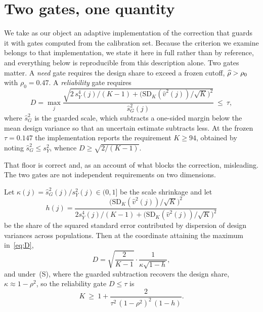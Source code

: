 \section{Two gates, one quantity}\label{sec:coupling}

We take as our object an adaptive implementation of the correction that guards
it with gates computed from the calibration set. Because the criterion we
examine belongs to that implementation, we state it here in full rather than by
reference, and everything below is reproducible from this description alone.
Two gates matter. A \emph{need}
gate requires the design share to exceed a frozen cutoff, $\widehat{\rho}>\rho_0$ with
$\rho_0=0.47$. A \emph{reliability} gate requires
\begin{equation}\label{eq:D}
D=\max_j\frac{\sqrt{2\,s_Y^4(j)/(K-1)+\big(\mathrm{SD}_K(\widehat v^2(j))/\sqrt K\big)^2}}
{\widehat s_G^2(j)}\ \le\ \tau,
\end{equation}
where $\widehat s_G^2$ is the guarded scale, which subtracts a one-sided margin
below the mean design variance so that an uncertain estimate subtracts less. At
the frozen $\tau=0.147$ the implementation reports the requirement $K\ge94$,
obtained by noting $\widehat s_G^2\le s_Y^2$, whence $D\ge\sqrt{2/(K-1)}$.

That floor is correct and, as an account of what blocks the correction,
misleading. The two gates are not independent requirements on two dimensions.

\begin{proposition}\label{prop:coupling}
Let $\kappa(j)=\widehat s_G^2(j)/s_Y^2(j)\in(0,1]$ be the scale shrinkage and let
\[
h(j)=\frac{\big(\mathrm{SD}_K(\widehat v^2(j))/\sqrt K\big)^2}
{2s_Y^4(j)/(K-1)+\big(\mathrm{SD}_K(\widehat v^2(j))/\sqrt K\big)^2}
\]
be the share of the squared standard error contributed by dispersion of design
variances across populations. Then at the coordinate attaining the maximum
in~\eqref{eq:D},
\begin{equation}\label{eq:identity}
D=\sqrt{\frac{2}{K-1}}\cdot\frac{1}{\kappa\sqrt{1-h}},
\end{equation}
and under~(S), where the guarded subtraction recovers the design share,
$\kappa\approx1-\rho^2$, so the reliability gate $D\le\tau$ is
\begin{equation}\label{eq:boundary}
K\ \ge\ 1+\frac{2}{\tau^2\,(1-\rho^2)^2\,(1-h)}.
\end{equation}
\end{proposition}

